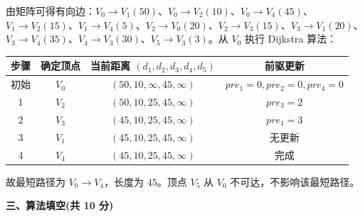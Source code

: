 \begin{question}[最短路径]
\begin{solution}
由矩阵可得有向边：$V_0\to V_1(50)$、$V_0\to V_2(10)$、$V_0\to V_4(45)$、$V_1\to V_2(15)$、$V_1\to V_4(5)$、$V_2\to V_0(20)$、$V_2\to V_3(15)$、$V_3\to V_1(20)$、$V_3\to V_4(35)$、$V_4\to V_3(30)$、$V_5\to V_3(3)$。从 $V_0$ 执行 Dijkstra 算法：
\begin{center}
\small
\begin{tabular}{c c c c}
\toprule
步骤 & 确定顶点 & 当前距离 $(d_1,d_2,d_3,d_4,d_5)$ & 前驱更新 \\
\midrule
初始 & $V_0$ & $(50,10,\infty,45,\infty)$ & $pre_1=0,pre_2=0,pre_4=0$ \\
1 & $V_2$ & $(50,10,25,45,\infty)$ & $pre_3=2$ \\
2 & $V_3$ & $(45,10,25,45,\infty)$ & $pre_1=3$ \\
3 & $V_1$ & $(45,10,25,45,\infty)$ & 无更新 \\
4 & $V_4$ & $(45,10,25,45,\infty)$ & 完成 \\
\bottomrule
\end{tabular}
\end{center}
故最短路径为 $V_0\to V_4$，长度为 $45$。顶点 $V_5$ 从 $V_0$ 不可达，不影响该最短路径。
\end{solution}
\end{question}

\clearpage

\textbf{三、算法填空(共 10 分)}



